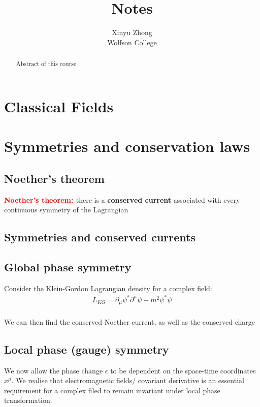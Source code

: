 \documentclass[12pt,a4paper]{article}
\author{Xinyu Zhong\\Wolfson College}
\title{Notes}
\newcommand{\theorem}[2]{\textbf{\textcolor{red}{#1: }}{#2}\\}
\begin{document}
\begin{titlepage}
    \maketitle
\end{titlepage}

\tableofcontents

\newpage

\begin{abstract}
\noindent
Abstract of this course
\end{abstract}

\section{Classical Fields}


\section{Symmetries and conservation laws}
    \subsection{Noether's theorem}
    \theorem{Noether's theorem}{there is a \textbf{conserved current} associated with every continuous symmetry of the Lagrangian}
    \subsection{Symmetries and conserved currents}
    \subsection{Global phase symmetry}
    Consider the Klein-Gordon Lagrangian density for a complex field:
    \begin{align*}
        L_{KG}=\partial_\mu\psi^*\partial^\mu\psi-m^2\psi^*\psi
    \end{align*}\\
    We can then find the conserved Noether current, as well as the conserved charge 

    \subsection{Local phase (gauge) symmetry}
    We now allow the phase change $\epsilon$ to be dependent on the space-time coordinates $x^\mu$. 
    We realise that electromagnetic fields/ covariant derivative is an essential requirement for a complex filed to remain invariant under local phase transformation.
\end{document}
